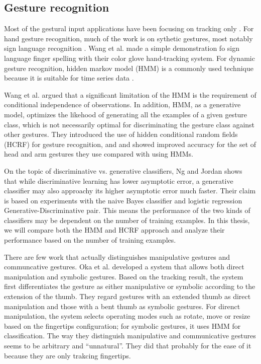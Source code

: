 \subsection{Gesture recognition}
Most of the gestural input applications have been focusing on tracking only
\cite{harrison11} \cite{larson11}. For hand gesture recognition, much of the
work is on sythetic gestures, most notably sign language recognition
\cite{Bauer00} \cite{kadous02}. Wang et al. \cite{Wang09} made a simple
demonstration fo sign language finger spelling with their color glove hand-tracking system. 
For dynamic gesture recognition, hidden markov model (HMM) is a commonly used
technique because it is suitable for time series data \cite{sharma00}. 

Wang et al. \cite{wang06} argued that a significant limitation of the
HMM is the requirement of conditional independence of observations. In
addition, HMM, as a generative model, optimizes the likehood of
generating all the examples of a given gesture class, which is not
necessarily optimal for discriminating the gesture class against other
gestures. They introduced the use of hidden conditional random fields (HCRF) for
gesture recognition, and and showed improved accuracy for the set of head and
arm gestures they use compared with using HMMs. 

On the topic of discriminative vs. generative classifiers, Ng and Jordan
\cite{ng02} shows that while discriminative learning has lower asymptotic error,
a generative classifier may also approachy its higher asymptotic error much
faster. Their claim is based on experiments with the naive Bayes classifier and
logistic regression Generative-Discriminative pair. This means the performance
of the two kinds of classifiers may be dependent on the number of training
examples. In this thesis, we will compare both the HMM and HCRF approach and
analyze their performance based on the number of training examples.

There are few work that actually distinguishes manipulative gestures and
communcative gestures. Oka et al. \cite{Oka02} developed a system that allows
both direct manipulation and symbolic gestures. Based on the tracking result,
the system first differentiates the gesture as either manipulative or symbolic 
according to the extension of the thumb. They regard gestures with an extended 
thumb as direct manipulation and those with a bent thumb as symbolic gestures. 
For direnct manipulation, the system selects operating modes such as rotate, 
move or resize based on the fingertips configuration; for symbolic gestures, it 
uses HMM for classification. The way they distinguish manipulative and 
communicative gestures seems to be arbitrary and ``unnatural''. They did that 
probably for the ease of it because they are only trakcing fingertips.


